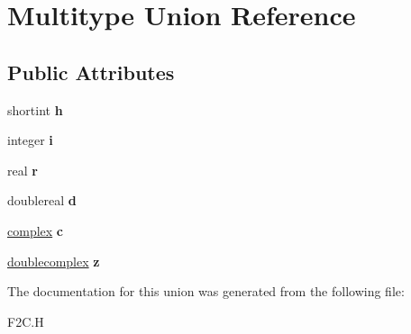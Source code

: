 \hypertarget{union_multitype}{\section{Multitype Union Reference}
\label{union_multitype}
}
\subsection*{Public Attributes}
\begin{DoxyCompactItemize}
\item 
\hypertarget{union_multitype_a556d63188675caed2d40a14cbfe740e8}{shortint {\bfseries h}}\label{union_multitype_a556d63188675caed2d40a14cbfe740e8}

\item 
\hypertarget{union_multitype_a8b913dac6031042a8f5192ee033bb5f1}{integer {\bfseries i}}\label{union_multitype_a8b913dac6031042a8f5192ee033bb5f1}

\item 
\hypertarget{union_multitype_ab4eba1c6e83e32ee5b08b7550b46907c}{real {\bfseries r}}\label{union_multitype_ab4eba1c6e83e32ee5b08b7550b46907c}

\item 
\hypertarget{union_multitype_ad14eee30c207909f64d8adc2110dc8a1}{doublereal {\bfseries d}}\label{union_multitype_ad14eee30c207909f64d8adc2110dc8a1}

\item 
\hypertarget{union_multitype_a30e3bb4e990a88a087fad898df096868}{\hyperlink{structcomplex}{complex} {\bfseries c}}\label{union_multitype_a30e3bb4e990a88a087fad898df096868}

\item 
\hypertarget{union_multitype_aa031f83e1db7e8f751458cebe7b9d897}{\hyperlink{structdoublecomplex}{doublecomplex} {\bfseries z}}\label{union_multitype_aa031f83e1db7e8f751458cebe7b9d897}

\end{DoxyCompactItemize}


The documentation for this union was generated from the following file\+:\begin{DoxyCompactItemize}
\item 
F2\+C.\+H\end{DoxyCompactItemize}
